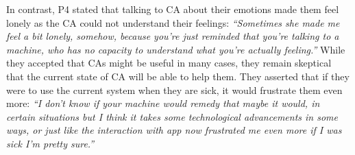         In contrast, P4 stated that talking to \ac{CA} about their emotions made them feel lonely as the \ac{CA} could not understand their feelings:
                \textit{
                ``Sometimes she made me feel a bit lonely, somehow, because 
                you're just reminded that you're talking to a machine, who has no capacity to understand what you're actually feeling.''} 
        While they accepted that \acp{CA} might be useful in many cases, they remain skeptical that the current state of \ac{CA} will be able to help them. They asserted that if they were to use the current system when they are sick, it would frustrate them even more:
            \textit{
                ``I don't know if your machine would remedy that maybe it would, in certain situations but I think it takes some technological advancements in some ways, or just like the interaction with \acl{app} now frustrated me even more if I was sick I'm pretty sure.''}
